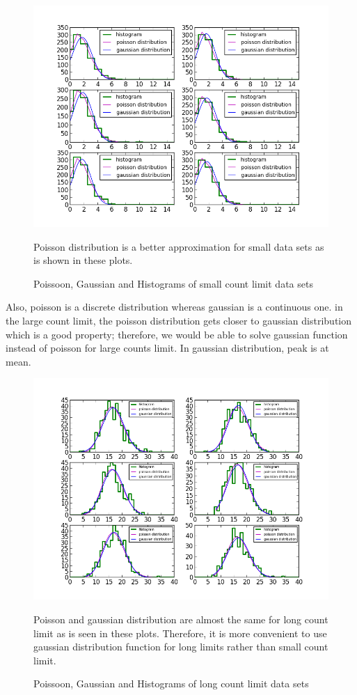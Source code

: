 \documentclass[letterpaper,12pt]{article}
\begin{document}
\begin{figure}
\centering
\includegraphics[scale=0.9]{poisson-gaussian-histograms-8.png}
\caption{Poissoon, Gaussian and Histograms of small count limit data sets}
Poisson distribution is a better approximation for small data sets as is shown in these plots.\end{figure}

 Also, poisson is a discrete distribution whereas gaussian is a continuous one. in the large count limit, the poisson distribution gets closer to gaussian distribution which is a good property; therefore, we would be able to solve gaussian function instead of poisson for large counts limit. In gaussian distribution, peak is at mean.
 
 \begin{figure}
\centering
\includegraphics[scale=0.9]{poisson-gaussian-histograms-8-long.png}
\caption{Poissoon, Gaussian and Histograms of long count limit data sets}
Poisson and gaussian distribution are almost the same for long count limit as is seen in these plots. Therefore, it is more convenient to use gaussian distribution function for long limits rather than small count limit.
\end{figure}
 
 
 
 
 
 
\end{document}
